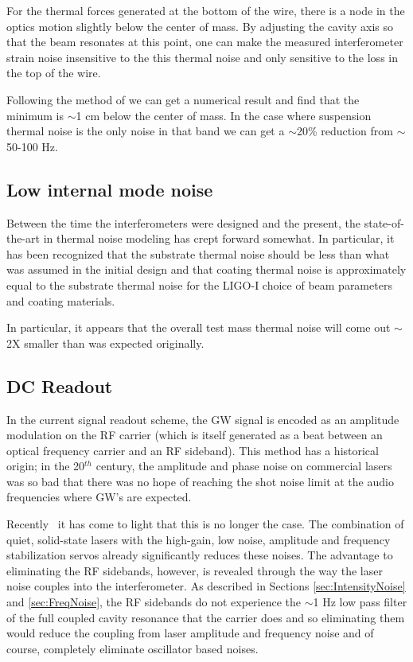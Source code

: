 For the thermal forces generated at the bottom of the wire, there is a node
in the optics motion slightly below the center of mass. By adjusting the cavity
axis so that the beam resonates at this point, one can make the measured
interferometer strain noise insensitive to the this thermal noise and only
sensitive to the loss in the top of the wire.

Following the method of \cite{Gaby:Thermal} we can get a numerical result and
find that the minimum is $\sim$1 cm below the center of mass. In the case where
suspension thermal noise is the only noise in that band we can get a $\sim$20\%
reduction from $\sim$50-100 Hz.


\subsection{Low internal mode noise}

Between the time the interferometers were designed and the present, the state-of-the-art
in thermal noise modeling has crept forward somewhat. In particular, it has been
recognized that the substrate thermal noise should be less than what was assumed
in the initial design and that coating thermal noise is approximately equal to
the substrate thermal noise for the LIGO-I choice of beam parameters and coating
materials.

In particular, it appears that the overall test mass thermal noise will come out
$\sim$2X smaller than was expected originally.
 

\subsection{DC Readout}
\label{sec:DCreadout}

In the current signal readout scheme, the GW signal is encoded as 
an amplitude modulation on the RF carrier (which is itself generated as a
beat between an optical frequency carrier and an RF sideband). This method
has a historical origin; in the 20$^{th}$ century, the amplitude and
phase noise on commercial lasers was so bad that there was no hope of
reaching the shot noise limit at the audio frequencies where GW's are
expected.

Recently~\cite{Peter:DCreadout} it has come to light that this is no 
longer the case. The combination of quiet, solid-state lasers with
the high-gain, low noise, amplitude and frequency stabilization servos
already significantly reduces these noises. The advantage to eliminating
the RF sidebands, however, is revealed through the way the laser noise
couples into the interferometer. As described in Sections
\ref{sec:IntensityNoise} and \ref{sec:FreqNoise}, the RF sidebands do
not experience the $\sim$1 Hz low pass filter of the full coupled
cavity resonance that the carrier does and so eliminating them
would reduce the coupling from laser amplitude and frequency noise
and of course, completely eliminate oscillator based noises.

